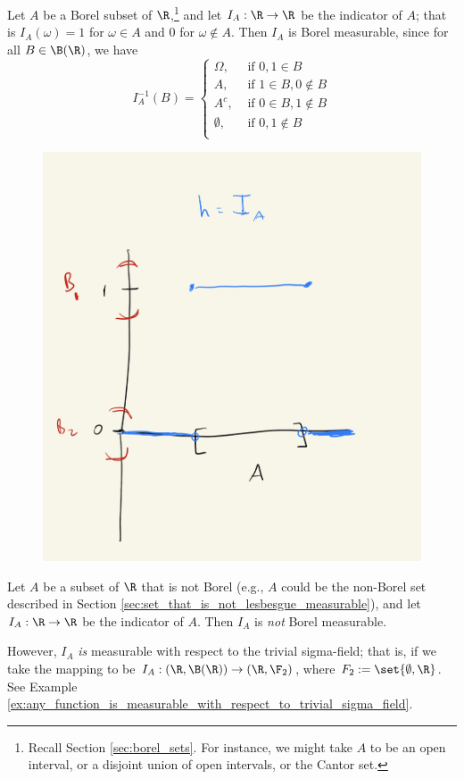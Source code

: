 \documentclass{article} %
\begin{document}
\begin{example}{}
Let $A$ be a Borel subset of $\R$,\footnote{Recall Section \ref{sec:borel_sets}.  For instance, we might take $A$ to be an open interval, or a disjoint union of open intervals, or the Cantor set.} and let $I_A : \R \to \R$ be the indicator of $A$; that is $I_A(\omega)=1$ for $\omega \in A$ and $0$ for $\omega \not\in A$. Then $I_A$ is Borel measurable, since for all $B \in \B(\R)$, we have
\[ I_A^{-1}(B) = 
\begin{cases}
\Omega, & \text{ if } 0,1 \in B\\ 
A, & \text{ if } 1 \in B, 0 \not\in B \\
A^c, & \text{ if } 0 \in B, 1 \not\in B \\	
\emptyset, & \text{ if } 0,1 \not\in B\\ 
\end{cases}
\]

\begin{figure}[H]
\centering
\includegraphics[width=.5\textwidth]{images/indicator_of_borel_set}	
\end{figure}

\end{example}

\begin{example}{}
Let $A$ be a subset of $\R$ that is not Borel (e.g., $A$ could be the non-Borel set described in Section \ref{sec:set_that_is_not_lesbesgue_measurable}), and let $I_A : \R \to \R$ be the indicator of $A$.   Then $I_A$ is \textit{not} Borel measurable.  

However, $I_A$  \textit{is} measurable with respect to the trivial sigma-field; that is, if we take the mapping to be $I_A : (\R, \B(\R)) \to (\R, \F_2)$, where $F_2 := \set{\emptyset, \R}$.  See Example \ref{ex:any_function_is_measurable_with_respect_to_trivial_sigma_field}.
\label{ex:indicators_of_non_borel_sets_are_not_borel_measurable}
\end{example}
\end{document}
